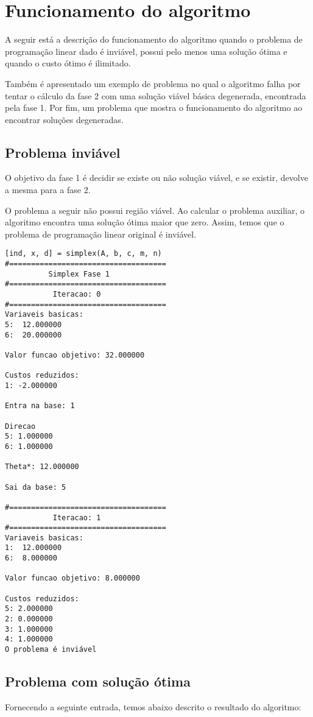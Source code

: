 \documentclass[
	12pt,				%
	openright,			%
	oneside,			%
	a4paper,			%
	english,			%
	french,				%
	spanish,			%
	brazil,				%
	]{abntex2}
\begin{document}
\chapter{Funcionamento do algoritmo}

A seguir está a descrição do funcionamento do algoritmo quando o problema de
programação linear dado é inviável, possui pelo menos uma solução ótima e quando o custo 
ótimo é ilimitado. 

Também é apresentado um exemplo de problema no qual o algoritmo falha por tentar o cálculo da fase 2 com uma solução viável básica degenerada, encontrada pela fase 1. Por fim, um problema que mostra o funcionamento do algoritmo ao encontrar soluções degeneradas.


\section{Problema inviável}
O objetivo da fase 1 é decidir se existe ou não solução viável, e se existir, devolve a mesma para a fase 2.

O problema a seguir não possui região viável. Ao calcular o problema auxiliar, o algoritmo encontra uma solução ótima maior que zero. Assim, temos que o problema de programação linear original é inviável.

\begin{verbatim}
[ind, x, d] = simplex(A, b, c, m, n)
#====================================
          Simplex Fase 1
#====================================
           Iteracao: 0
#====================================
Variaveis basicas:
5:  12.000000
6:  20.000000

Valor funcao objetivo: 32.000000

Custos reduzidos:
1: -2.000000

Entra na base: 1

Direcao
5: 1.000000
6: 1.000000

Theta*: 12.000000

Sai da base: 5

#====================================
           Iteracao: 1
#====================================
Variaveis basicas:
1:  12.000000
6:  8.000000

Valor funcao objetivo: 8.000000

Custos reduzidos:
5: 2.000000
2: 0.000000
3: 1.000000
4: 1.000000
O problema é inviável 
\end{verbatim}


\section{Problema com solução ótima}
Fornecendo a seguinte entrada, temos abaixo descrito o resultado do algoritmo:
\end{document}
